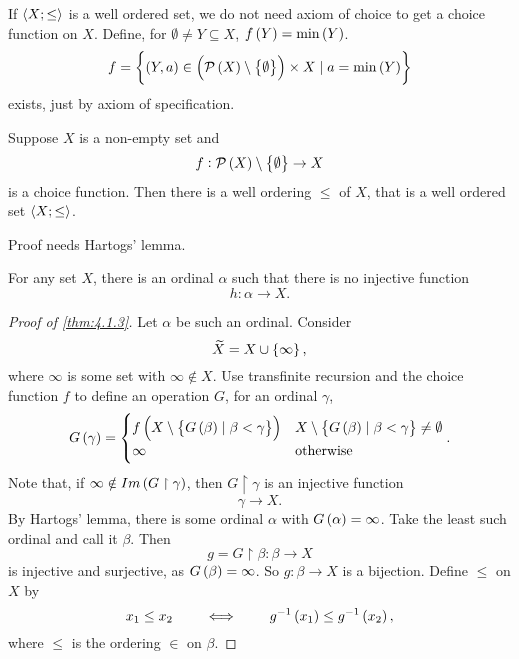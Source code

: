 \begin{note*}
If $ \left\langle X; \le \right\rangle $ is a well ordered set, we do not need axiom of choice to get a choice function on $ X $. Define, for $ \emptyset \ne Y \subseteq X $, $ f\br{Y} = \min\br{Y} $.
$$ f = \cbr{\br{Y, a} \in \br{\PP\br{X} \setminus \cbr{\emptyset}} \times X \mid a = \min\br{Y}} $$
exists, just by axiom of specification.
\end{note*}

\begin{theorem}
\label{thm:4.1.3}
Suppose $ X $ is a non-empty set and
$$ f : \PP\br{X} \setminus \cbr{\emptyset} \to X $$
is a choice function. Then there is a well ordering $ \le $ of $ X $, that is a well ordered set $ \left\langle X; \le \right\rangle $.
\end{theorem}

Proof needs Hartogs' lemma.

\begin{lemma}
\label{lem:4.1.4}
For any set $ X $, there is an ordinal $ \alpha $ such that there is no injective function
$$ h : \alpha \to X. $$
\end{lemma}

\begin{proof}[Proof of \ref{thm:4.1.3}]
Let $ \alpha $ be such an ordinal. Consider
$$ \widetilde{X} = X \cup \cbr{\infty}, $$
where $ \infty $ is some set with $ \infty \notin X $. Use transfinite recursion and the choice function $ f $ to define an operation $ G $, for an ordinal $ \gamma $,
$$ G\br{\gamma} =
\begin{cases}
f\br{X \setminus \cbr{G\br{\beta} \mid \beta < \gamma}} & X \setminus \cbr{G\br{\beta} \mid \beta < \gamma} \ne \emptyset \\
\infty & \text{otherwise}
\end{cases}.
$$
Note that, if $ \infty \notin Im\br{G \upharpoonright \gamma} $, then $ G \upharpoonright \gamma $ is an injective function
$$ \gamma \to X. $$
By Hartogs' lemma, there is some ordinal $ \alpha $ with $ G\br{\alpha} = \infty $. Take the least such ordinal and call it $ \beta $. Then
$$ g = G \upharpoonright \beta : \beta \to X $$
is injective and surjective, as $ G\br{\beta} = \infty $. So $ g : \beta \to X $ is a bijection. Define $ \le $ on $ X $ by
$$ x_1 \le x_2 \qquad \iff \qquad g^{-1}\br{x_1} \le g^{-1}\br{x_2}, $$
where $ \le $ is the ordering $ \in $ on $ \beta $.
\end{proof}

\pagebreak

